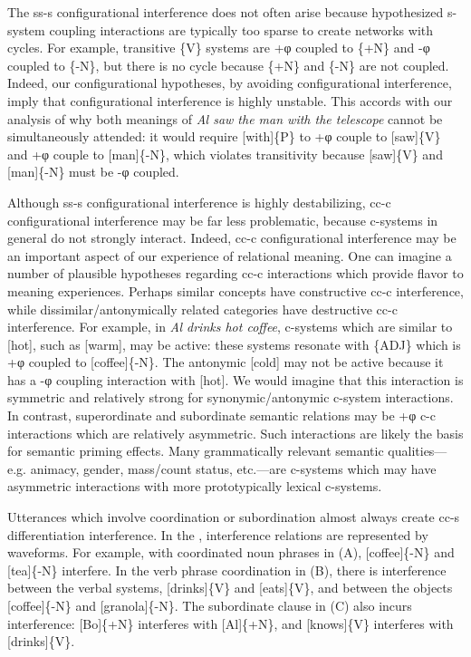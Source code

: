   The ss-s configurational interference does not often arise because hypothesized s-system coupling interactions are typically too sparse to create networks with cycles. For example, transitive \{V\} systems are +φ coupled to \{+N\} and -φ coupled to \{-N\}, but there is no cycle because \{+N\} and \{-N\} are not coupled. Indeed, our configurational hypotheses, by avoiding configurational interference, imply that configurational interference is highly unstable. This accords with our analysis of why both meanings of \textit{Al saw the man with the telescope} cannot be simultaneously attended: it would require [with]\{P\} to +φ couple to [saw]\{V\} and +φ couple to [man]\{-N\}, which violates transitivity because [saw]\{V\} and [man]\{-N\} must be -φ coupled. 

  Although ss-s configurational interference is highly destabilizing, cc-c configurational interference may be far less problematic, because c-systems in general do not strongly interact. Indeed, cc-c configurational interference may be an important aspect of our experience of relational meaning. One can imagine a number of plausible hypotheses regarding cc-c interactions which provide flavor to meaning experiences. Perhaps similar concepts have constructive cc-c interference, while dissimilar/antonymically related categories have destructive cc-c interference. For example, in \textit{Al drinks hot coffee}, c-systems which are similar to [hot], such as [warm], may be active: these systems resonate with \{\textsc{ADJ}\} which is +φ coupled to [coffee]\{-N\}. The antonymic [cold] may not be active because it has a -φ coupling interaction with [hot]. We would imagine that this interaction is symmetric and relatively strong for synonymic/antonymic c-system interactions. In contrast, superordinate and subordinate semantic relations may be +φ c-c interactions which are relatively asymmetric. Such interactions are likely the basis for semantic priming effects. Many grammatically relevant semantic qualities—e.g. animacy, gender, mass/count status, etc.—are c-systems which may have asymmetric interactions with more prototypically lexical c-systems.

  Utterances which involve coordination or subordination almost always create cc-s differentiation interference. In the {\figurebelow}, interference relations are represented by waveforms. For example, with coordinated noun phrases in (A), [coffee]\{-N\} and [tea]\{-N\} interfere. In the verb phrase coordination in (B), there is interference between the verbal systems, [drinks]\{V\} and [eats]\{V\}, and between the objects [coffee]\{-N\} and [granola]\{-N\}. The subordinate clause in (C) also incurs interference: [Bo]\{+N\} interferes with [Al]\{+N\}, and [knows]\{V\} interferes with [drinks]\{V\}.

